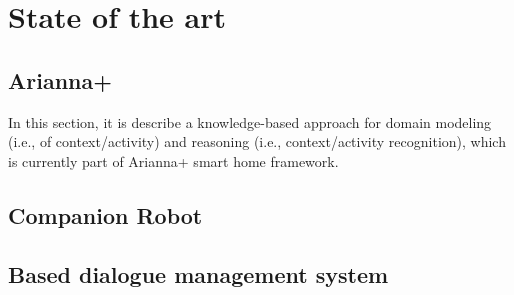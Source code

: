\documentclass{thesisreport}
\begin{document}
 \chapter{State of the art}
 
 \section{Arianna+} \label{Arianna}     
 In this section, it is describe a knowledge-based approach for domain modeling (i.e., of context/activity) and reasoning (i.e., context/activity recognition), which is currently part of Arianna+ smart home framework.
 
 
 
 \section{Companion Robot}  \label{companionRobot}
 
 \section{Based dialogue management system} \label{speech}

  
 
 
 
 
 
 
\end{document}

